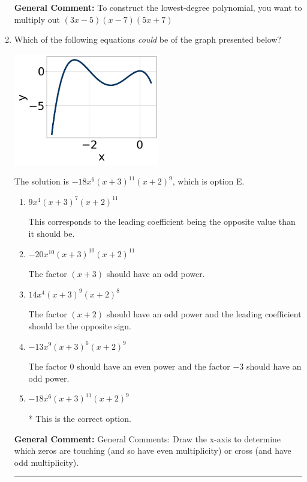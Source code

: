 \documentclass{extbook}[14pt]
\newcommand{\litem}[1]{\item #1

\rule{\textwidth}{0.4pt}}
\begin{document}
\begin{enumerate}
{\textbf{General Comment:} To construct the lowest-degree polynomial, you want to multiply out $(3x -5)(x -7)(5x + 7)$
}
\litem{
Which of the following equations \textit{could} be of the graph presented below?

\begin{center}
    \includegraphics[width=0.5\textwidth]{../Figures/polyGraphToFunctionCopyA.png}
\end{center}


The solution is \( -18x^{6} (x + 3)^{11} (x + 2)^{9} \), which is option E.\begin{enumerate}[label=\Alph*.]
\item \( 9x^{4} (x + 3)^{7} (x + 2)^{11} \)

This corresponds to the leading coefficient being the opposite value than it should be.
\item \( -20x^{10} (x + 3)^{10} (x + 2)^{11} \)

The factor $(x + 3)$ should have an odd power.
\item \( 14x^{4} (x + 3)^{9} (x + 2)^{8} \)

The factor $(x + 2)$ should have an odd power and the leading coefficient should be the opposite sign.
\item \( -13x^{9} (x + 3)^{6} (x + 2)^{9} \)

The factor $0$ should have an even power and the factor $-3$ should have an odd power.
\item \( -18x^{6} (x + 3)^{11} (x + 2)^{9} \)

* This is the correct option.
\end{enumerate}

\textbf{General Comment:} General Comments: Draw the x-axis to determine which zeros are touching (and so have even multiplicity) or cross (and have odd multiplicity).
}
\end{enumerate}
\end{document}
